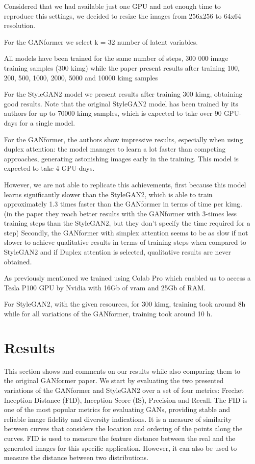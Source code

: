 \documentclass{article}
\begin{document}
	Considered that we had available just one GPU and not enough time to reproduce this settings, we 
	decided to resize the images from 256x256 to 64x64 resolution.
	
	
	For the GANformer we select k = 32 number of latent variables. 
	
	All models have been trained for the same number of steps, 300 000 image
	training samples (300 kimg) while the paper present results after training 100, 200, 500, 1000, 2000, 
	5000 and 10000 kimg samples
	
	For the StyleGAN2 model we present results after training 300 kimg, obtaining 
	good results.
	Note that the original StyleGAN2 model has been trained by its authors \cite{karras2020analyzing} 
	for up to 70000 kimg samples, which is expected to take over 90 GPU-days for a single model. 
	
	
	For the GANformer, the authors \cite{karras2020analyzing} show impressive results, especially when 
	using duplex attention: the model manages to learn a lot faster than competing approaches, 
	generating astonishing images early in the training. This model is expected to take 4 GPU-days.
	
	However, we are not able to replicate this achievements, first because this model learns significantly 
	slower than the StyleGAN2, which is able to train approximately 
	1.3 times faster than the GANformer in terms of time per kimg.
	(in the paper they reach better results with the GANformer with 3-times less training steps than the 
	StyleGAN2, but they don't specify the time required for a step)
	Secondly, the GANformer with simplex attention seems to be as slow if not slower to achieve 
	qualitative results
	in terms of training steps when compared to StyleGAN2 and if Duplex attention is selected, 
	qualitative results are never obtained.
	
	As previously mentioned we trained using Colab Pro which enabled us to access a Tesla P100 GPU 
	by Nvidia with 16Gb of vram 
	and 25Gb of RAM.
	
	For StyleGAN2, with the given resources, for 300 kimg, training took around 8h while for all 
	variations of the GANformer, training took around 10 h.
	
	
	\section{Results}\label{sec:results}
	This section shows and comments on our results while also comparing them to the original 
	GANformer 
	paper. We start by evaluating the two presented variations of the GANformer and StyleGAN2 over a 
	set 
	of four metrics: Frechet Inception Distance (FID), Inception Score (IS), Precision and Recall. The FID 
	is one of the most popular metrics for evaluating GANs, providing stable and reliable image fidelity 
	and 
	diversity indications. It is a measure of similarity between curves that considers the location and 
	ordering 
	of the points along the curves. FID is used to measure the feature distance between the real and the 
	generated 
	images for this specific application. However, it can also be used to measure the distance between 
	two distributions.
	
\end{document}

